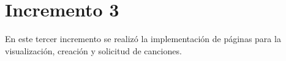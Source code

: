 \section{Incremento 3}

En este tercer incremento se realizó la implementación de páginas para la visualización, creación y solicitud de canciones.



